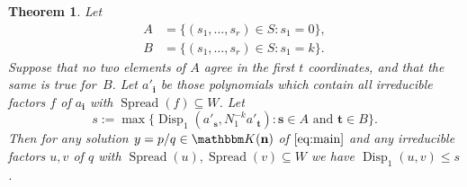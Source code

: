 \documentclass[a4paper]{sig-alternate}
\let\set\mathbbm
\def\vec#1{\mathbf{#1}}
\def\spread{\operatorname{Spread}}
\def\disp{\operatorname{Disp}}
\def\K{\set K}
\newtheorem{theorem}{Theorem}
\begin{document}
\begin{theorem}\label{thm:disp}
  Let
  \begin{equation}\label{Equ:ABSet}
  \begin{split}
    A&=\{(s_1,\dots,s_r)\in S: s_1=0\},\\
    B&=\{(s_1,\dots,s_r)\in S: s_1=k\}.
    \end{split}
  \end{equation}
  Suppose that no two elements of $A$ agree in the first $t$ coordinates,
  and that the same is true for~$B$. Let $a'_{\vec i}$ be those polynomials which contain all irreducible factors $f$ of $a_{\vec i}$ with $\spread(f)\subseteq W$. Let
  \[
    s:=\max\{\disp_1(a'_{\vec s},N_1^{-k}a'_{\vec t}): \vec s\in A\text{ and }\vec t\in B\}.
  \]
  Then for any solution $y=p/q\in\K(\vec n)$ of $\eqref{eq:main}$ and any irreducible
  factors $u,v$ of $q$ with $\spread(u),\spread(v)\subseteq W$ we have $\disp_1(u,v)\leq s$.
\end{theorem}
\end{document}
